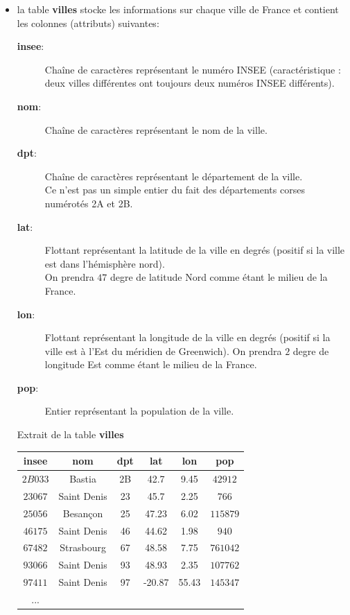 \documentclass[10pt,fleqn]{article} %
\begin{document}
	\begin{itemize}
		\item	la table \textbf{villes} stocke les informations sur chaque ville 
		de France et contient les colonnes (attributs) suivantes:
		
			\begin{description}
				\item[\textbf{insee}:] Chaîne de caractères représentant le 
				numéro INSEE (caractéristique : deux villes différentes ont 
				toujours deux numéros INSEE différents).

				\item[\textbf{nom}:] Chaîne de caractères représentant le nom de la ville.

				\item[\textbf{dpt}:] Chaîne de caractères représentant le département de la ville.\\
				Ce n'est pas un simple entier du fait des départements corses numérotés
				2A et 2B.

				\item[\textbf{lat}:] Flottant représentant la latitude de la 
				ville en degrés (positif si la ville est dans l'hémisphère 
				nord).\\ On prendra $47$ degre de latitude Nord comme étant 
				le milieu de la France.

				\item[\textbf{lon}:] Flottant représentant la longitude de la 
				ville en degrés (positif si la ville est à l'Est du méridien 
				de Greenwich). On prendra $2$ degre de longitude Est comme 
				étant le milieu de la France.
				
				\item[\textbf{pop}:] Entier représentant la population de la ville.
				
			\end{description}


\begin{exemple}
Extrait de la table \textbf{villes}
\begin{center}\begin{tabular}{*{6}{c}}
\textbf{insee} & \textbf{nom} & \textbf{dpt} & \textbf{lat} & \textbf{lon} & \textbf{pop}\\ 
\hline \hline
$2B033$&Bastia&2B&42.7&9.45&$42912$\\ 
$23067$&Saint Denis&23&45.7&2.25&$766$\\ 
$25056$&Besançon&25&47.23&6.02&$115879$\\ 
$46175$&Saint Denis&46&44.62&1.98&$940$\\ 
$67482$&Strasbourg&67&48.58&7.75&$761042$\\ 
$93066$&Saint Denis&93&48.93&2.35&$107762$\\ 
$97411$&Saint Denis&97&-20.87&55.43&$145347$\\ 
...\end{tabular}\end{center}
\end{exemple}


\end{itemize}
\end{document}
